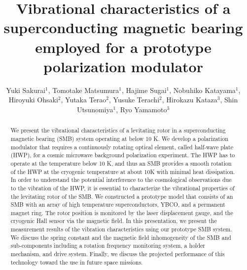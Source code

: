\documentclass[a4paper]{jpconf}
\begin{document}
\title{Vibrational characteristics of a superconducting magnetic bearing employed for a prototype polarization modulator}

\author{Yuki Sakurai$^{1}$, Tomotake Matsumura$^{1}$, Hajime Sugai$^{1}$, Nobuhiko Katayama$^{1}$, Hiroyuki Ohsaki$^{2}$, Yutaka Terao$^{2}$, Yusuke Terachi$^{2}$, Hirokazu Kataza$^{3}$, Shin Utsunomiya$^{1}$, Ryo Yamamoto$^{3}$}
\vspace{2mm}
\address{
$^{1}$Kavli Institute for the Physics and Mathematics of the Universe (WPI),The University of Tokyo Institutes for Advanced Study, The University of Tokyo, 5-1-5 Kashiwanoha, Kashiwa, Chiba 277-8583, Japan \\
$^{2}$Graduate School of Frontier Sciences, The University of Tokyo, 5-1-5 Kashiwanoha, Kashiwa, Chiba 277-8561, Japan \\
$^{3}$Japan Aerospace Exploration Agency, Institute of Space and Astronautical Science (ISAS), 3-1-1 Yoshinodai, Chuo-ku, Sagamihara, Kanagawa 252-5210, Japan
}


\begin{abstract}
We present the vibrational characteristics of a levitating rotor in a superconducting magnetic bearing (SMB) system operating at below 10 K.
We develop a polarization modulator that requires a continuously rotating optical element, called half-wave plate (HWP), for a cosmic microwave background polarization experiment.
The HWP has to operate at the temperature below 10 K, and thus an SMB provides a smooth rotation of the HWP at the cryogenic temperature at about 10K with minimal heat dissipation.
In order to understand the potential interference to the cosmological observations due to the vibration of the HWP,
it is essential to characterize the vibrational properties of the levitating rotor of the SMB.
We constructed a prototype model that consists of an SMB with an array of high temperature superconductors, YBCO, and a permanent magnet ring.
The rotor position is monitored by the laser displacement gauge, and the cryogenic Hall sensor via the magnetic field.
In this presentation, we present the measurement results of the vibration characteristics using our prototype SMB system.
We discuss the spring constant and the magnetic field inhomogeneity of the SMB and sub-components including a rotation frequency monitoring system, a holder mechanism, and drive system.
Finally, we discuss the projected performance of this technology toward the use in future space missions.
\end{abstract}
\end{document}
